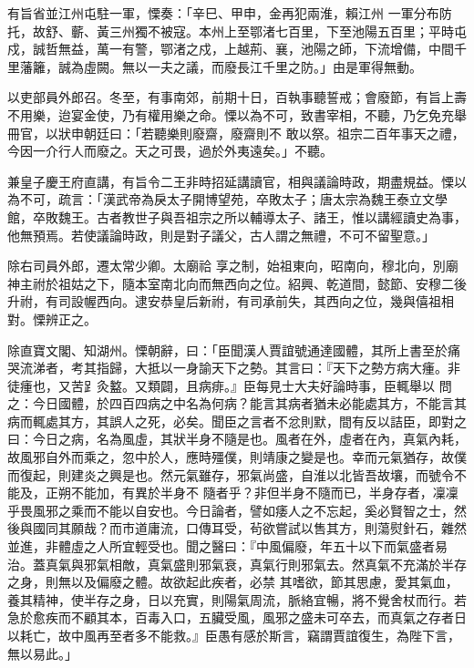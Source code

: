 \begin{pinyinscope}
 有旨省並江州屯駐一軍，慄奏：「辛巳、甲申，金再犯兩淮，賴江州
 一軍分布防托，故舒、蘄、黃三州獨不被寇。本州上至鄂渚七百里，下至池陽五百里；平時屯戍，誠哲無益，萬一有警，鄂渚之戍，上越荊、襄，池陽之師，下流增備，中間千里藩籬，誠為虛闕。無以一夫之議，而廢長江千里之防。」由是軍得無動。



 以吏部員外郎召。冬至，有事南郊，前期十日，百執事聽誓戒；會廢節，有旨上壽不用樂，迨宴金使，乃有權用樂之命。慄以為不可，致書宰相，不聽，乃乞免充舉冊官，以狀申朝廷曰：「若聽樂則廢齋，廢齋則不
 敢以祭。祖宗二百年事天之禮，今因一介行人而廢之。天之可畏，過於外夷遠矣。」不聽。



 兼皇子慶王府直講，有旨令二王非時招延講讀官，相與議論時政，期盡規益。慄以為不可，疏言：「漢武帝為戾太子開博望苑，卒敗太子；唐太宗為魏王泰立文學館，卒敗魏王。古者教世子與吾祖宗之所以輔導太子、諸王，惟以講經讀史為事，他無預焉。若使議論時政，則是對子議父，古人謂之無禮，不可不留聖意。」



 除右司員外郎，遷太常少卿。太廟祫
 享之制，始祖東向，昭南向，穆北向，別廟神主祔於祖姑之下，隨本室南北向而無西向之位。紹興、乾道間，懿節、安穆二後升祔，有司設幄西向。逮安恭皇后新祔，有司承前失，其西向之位，幾與僖祖相對。慄辨正之。



 除直寶文閣、知湖州。慄朝辭，曰：「臣聞漢人賈誼號通達國體，其所上書至於痛哭流涕者，考其指歸，大抵以一身諭天下之勢。其言曰：『天下之勢方病大瘇。非徒瘇也，又苦𧾷灸盭。又類闢，且病痱。』臣每見士大夫好論時事，臣輒舉以
 問之：今日國體，於四百四病之中名為何病？能言其病者猶未必能處其方，不能言其病而輒處其方，其誤人之死，必矣。聞臣之言者不忿則默，間有反以詰臣，即對之曰：今日之病，名為風虛，其狀半身不隨是也。風者在外，虛者在內，真氣內耗，故風邪自外而乘之，忽中於人，應時殭僕，則靖康之變是也。幸而元氣猶存，故僕而復起，則建炎之興是也。然元氣雖存，邪氣尚盛，自淮以北皆吾故壤，而號令不能及，正朔不能加，有異於半身不
 隨者乎？非但半身不隨而已，半身存者，凜凜乎畏風邪之乘而不能以自安也。今日論者，譬如痿人之不忘起，奚必賢智之士，然後與國同其願哉？而市道庸流，口傳耳受，茍欲嘗試以售其方，則蕩熨針石，雜然並進，非體虛之人所宜輕受也。聞之醫曰：『中風偏廢，年五十以下而氣盛者易治。蓋真氣與邪氣相敵，真氣盛則邪氣衰，真氣行則邪氣去。然真氣不充滿於半存之身，則無以及偏廢之體。故欲起此疾者，必禁
 其嗜欲，節其思慮，愛其氣血，養其精神，使半存之身，日以充實，則陽氣周流，脈絡宜暢，將不覺舍杖而行。若急於愈疾而不顧其本，百毒入口，五臟受風，風邪之盛未可卒去，而真氣之存者日以耗亡，故中風再至者多不能救。』臣愚有感於斯言，竊謂賈誼復生，為陛下言，無以易此。」




\end{pinyinscope}
